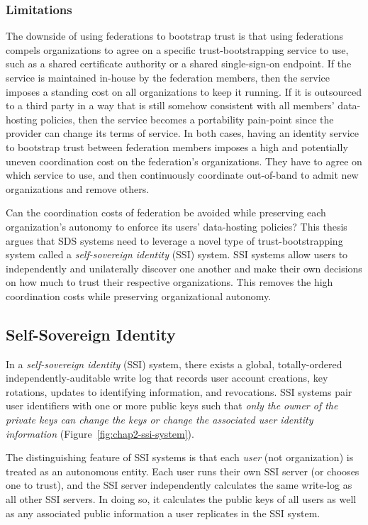 \subsubsection{Limitations}

The downside of using federations to bootstrap trust is that using federations compels
organizations to agree on a specific trust-bootstrapping service to use, such as
a shared certificate authority or a shared single-sign-on endpoint.  If the
service is maintained in-house by the
federation members, then the service imposes a standing cost on all organizations to keep it
running.  If it is outsourced to a third party in a way that is still somehow
consistent with all members' data-hosting policies, then the service becomes a portability
pain-point since the provider can change its terms of service.  In both cases,
having an identity service to bootstrap trust between federation members imposes
a high and potentially uneven coordination cost on the federation's organizations.
They have to agree on which service to use, and then continuously
coordinate out-of-band to admit new organizations and remove others.

Can the coordination costs of federation be avoided while
preserving each organization's autonomy to enforce its users' data-hosting
policies?  This thesis argues that SDS systems need to leverage a
novel type of trust-bootstrapping system called a \emph{self-sovereign identity}
(SSI) system.  SSI systems allow users to independently and unilaterally
discover one another and make their own decisions on how much to trust their
respective organizations.  This removes the high coordination costs while preserving
organizational autonomy.

\subsection{Self-Sovereign Identity}
\label{sec:chap2-ssi}

In a \emph{self-sovereign identity} (SSI) system, there exists a global,
totally-ordered independently-auditable write log that records user account creations, key rotations,
updates to identifying information, and revocations.  SSI systems 
pair user identifiers with one or more public keys such that \emph{only the 
owner of the private keys can 
change the keys or change the associated user identity information}
(Figure~\ref{fig:chap2-ssi-system}).

The distinguishing feature of SSI systems is that each \emph{user} (not
organization) is treated as an autonomous entity.  Each user runs their own
SSI server (or chooses one to trust), and the SSI server independently
calculates the same write-log as all other SSI servers.
In doing so, it calculates the public keys of all users as well as any
associated public information a user replicates in the SSI system.

